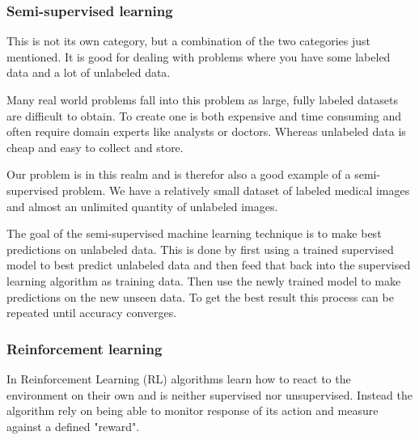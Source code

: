 \documentclass[thesis.tex]{subfiles}
\begin{document}
\subsubsection{Semi-supervised learning} \label{semi_supervised_learning}
This is not its own category, but a combination of the two categories just mentioned. It is good for dealing with problems where you have some labeled data and a lot of unlabeled data.

Many real world problems fall into this problem as large, fully labeled datasets are difficult to obtain. To create one is both expensive and time consuming and often require domain experts like analysts or doctors. Whereas unlabeled data is cheap and easy to collect and store.

Our problem is in this realm and is therefor also a good example of a semi-supervised problem. We have a relatively small dataset of labeled medical images and almost an unlimited quantity of unlabeled images.

The goal of the semi-supervised machine learning technique is to make best predictions on unlabeled data. This is done by first using a trained supervised model to best predict unlabeled data and then feed that back into the supervised learning algorithm as training data. Then use the newly trained model to make predictions on the new unseen data. To get the best result this process can be repeated until accuracy converges.



\subsubsection{Reinforcement learning} \label{sec:reinforcement learning}
In Reinforcement Learning (RL) algorithms learn how to react to the environment on their own and is neither supervised nor unsupervised. Instead the algorithm rely on being able to monitor response of its action and measure against a defined "reward".
\end{document}
